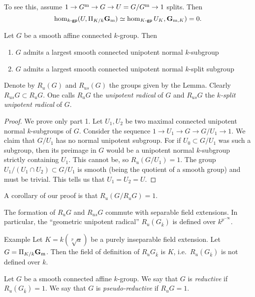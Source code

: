 To see this, assume $1 \to G^{\mathrm{m}} \to G \to U=G/G^{\mathrm{m}}\to 1$ splits. Then 
\[
  \hom_{k\textnormal{-}\mathsf{gp}}(U,\Pi_{K/k} \mathbf{G}_{\mathrm{m}}) \simeq \hom_{K\textnormal{-}\mathsf{gp}} U_K, \mathbf{G}_{\mathrm{m},K}) = 0. 
\]

\begin{lemm}
Let $G$ be a smooth affine connected $k$-group. Then 
\begin{enumerate}
  \item $G$ admits a largest smooth connected unipotent normal $k$-subgroup 
  \item $G$ admits a largest smooth connected unipotent normal $k$-split 
    subgroup 
\end{enumerate}
\end{lemm}

Denote by $R_u(G)$ and $R_{u s}(G)$ the groups given by the Lemma. Clearly 
$R_{us} G\subset R_u G$. One calls $R_u G$ the \emph{unipotent radical} of 
$G$ and $R_{us} G$ the \emph{$k$-split unipotent radical} of $G$. 

\begin{proof}
We prove only part 1. Let $U_1,U_2$ be two maximal connected unipotent normal $k$-subgroups of 
$G$. Consider the sequence $1 \to U_1 \to G \to G/U_1\to 1$. We claim that 
$G/U_1$ has no normal unipotent subgroup. For if 
$U_0\subset G/U_1$ was such a subgroup, then its preimage in 
$G$ would be a unipotent normal $k$-subgroup strictly containing $U_1$. 
This cannot be, so $R_u (G/U_1) = 1$. The group $U_1/(U_1\cap U_2)\subset G/U_1$ 
is smooth (being the quotient of a smooth group) and must be trivial. This tells 
us that $U_1=U_2=U$. 
\end{proof}

A corollary of our proof is that $R_u(G/R_u G)=1$. 

\begin{lemm}
The formation of $R_u G$ and $R_{u s} G$ commute with separable field extensions. 
In particular, the ``geometric unipotent radical'' $R_u(G_{\bar k})$ is defined 
over $k^{p^{-\infty}}$. 
\end{lemm}

\begin{enonce}[remark]{Example}\label{eg:pseudo-red}
Let $K=k(\sqrt[p] a)$ be a purely inseparable field extension. Let 
$G=\Pi_{K/k} \mathbf{G}_{\mathrm{m}}$. Then the field of definition of 
$R_u G_{\bar k}$ is $K$, i.e.\ $R_u (G_{\bar k})$ is not defined over $k$. 
\end{enonce}

Let $G$ be a smooth connected affine $k$-group. We say that $G$ is 
\emph{reductive} if $R_u(G_{\bar k})=1$. We say that $G$ is 
\emph{pseudo-reductive} if $R_u G=1$. 

